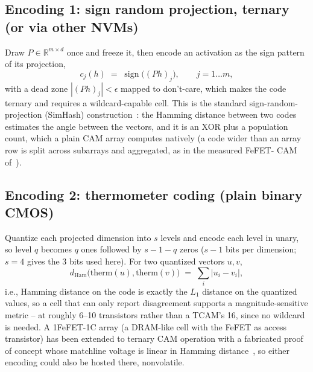 \documentclass[conference]{IEEEtran}
\newcommand{\cam}{{CAM}\xspace}
\newcommand{\tcam}{{TCAM}\xspace}
\newcommand{\fefet}{{FeFET}\xspace}
\begin{document}
\subsection{Encoding 1: sign random projection, ternary (or via other
NVMs)}
\label{subsec:SignRP}
Draw $P \in \mathbb{R}^{m \times d}$ once and freeze it, then encode
an activation as the sign pattern of its projection,
%
\begin{equation}
c_j(h) \;=\; \operatorname{sign}\!\big( (Ph)_j \big), \qquad j = 1 \ldots m,
\label{eq:signrp}
\end{equation}
%
with a dead zone $|(Ph)_j| < \epsilon$ mapped to don't-care, which
makes the code ternary and requires a wildcard-capable cell. This is
the standard sign-random-projection (SimHash)
construction~\cite{charikar2002simhash}: the Hamming distance between
two codes estimates the angle between the vectors, and it is an XOR
plus a population count, which a plain \cam array computes natively
(a code wider than an array row is split across subarrays and
aggregated, as in the measured \fefet - \cam
of~\cite{kazemi2022hdcfefet}).

\subsection{Encoding 2: thermometer coding (plain binary CMOS)}
\label{subsec:Thermometer}
Quantize each projected dimension into $s$ levels and encode each
level in unary, so level $q$ becomes $q$ ones followed by $s-1-q$
zeros ($s-1$ bits per dimension; $s=4$ gives the 3 bits used here). For two quantized vectors $u,v$,
%
\begin{equation}
d_{\mathrm{Ham}}\big(\mathrm{therm}(u), \mathrm{therm}(v)\big)
\;=\; \sum_i \big| u_i - v_i \big|,
\label{eq:thermo}
\end{equation}
%
i.e., Hamming distance on the code is exactly the $L_1$ distance on
the quantized values, so a cell that can only report disagreement
supports a magnitude-sensitive metric -- at roughly 6--10 transistors
rather than a \tcam's 16, since no wildcard is needed. A
1\fefet-1C array (a DRAM-like cell with the \fefet as access
transistor) has been extended to ternary \cam operation with a
fabricated proof of concept whose matchline voltage is linear in
Hamming distance~\cite{fefet1c2026}, so either encoding could also be
hosted there, nonvolatile.
\end{document}
